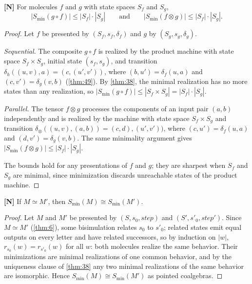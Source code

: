 \begin{theorem}\label{thm:40}
\textbf{[N]} For molecules $f$ and $g$ with state spaces $S_f$ and $S_g$,
\[
|S_{\min} (g \circ f)| \leq |S_f| \cdot |S_g|
\qquad\text{and}\qquad
|S_{\min} (f \otimes g)| \leq |S_f| \cdot |S_g| .
\]
\end{theorem}

\begin{proof}
Let $f$ be presented by $(S_f, s_f, \delta_f)$ and $g$ by $(S_g, s_g, \delta_g)$.

\emph{Sequential.} The composite $g \circ f$ is realized by the product machine with
state space $S_f \times S_g$, initial state $(s_f, s_g)$, and transition
$\delta_h ((u,v), a) = (c, (u',v'))$, where $(b, u') = \delta_f (u, a)$ and
$(c, v') = \delta_g (v, b)$ (\autoref{thm:49}). By \autoref{thm:38}, the minimal
realization has no more states than any realization, so $|S_{\min} (g \circ f)| \leq
|S_f \times S_g| = |S_f| \cdot |S_g|$.

\emph{Parallel.} The tensor $f \otimes g$ processes the components of an input pair
$(a, b)$ independently and is realized by the machine with state space $S_f \times S_g$
and transition $\delta_\otimes ((u,v),(a,b)) = (c,d),(u',v'))$, where
$(c, u') = \delta_f (u,a)$ and $(d, v') = \delta_g (v,b)$. The same minimality argument
gives $|S_{\min} (f \otimes g)| \leq |S_f| \cdot |S_g|$.

The bounds hold for any presentations of $f$ and $g$; they are sharpest when $S_f$ and
$S_g$ are minimal, since minimization discards unreachable states of the product
machine.
\end{proof}

\begin{theorem}\label{thm:41}
\textbf{[N]} If $M \simeq M'$, then $S_{\min} (M) \cong S_{\min} (M')$.
\end{theorem}

\begin{proof}
Let $M$ and $M'$ be presented by $(S, s_0, \mathit{step})$ and
$(S', s'_0, \mathit{step}')$. Since $M \simeq M'$ (\autoref{thm:6}), some bisimulation
relates $s_0$ to $s'_0$; related states emit equal outputs on every letter and have
related successors, so by induction on $|w|$, $r_{s_0} (w) = r_{s'_0} (w)$ for all $w$:
both molecules realize the same behavior. Their minimizations are minimal realizations
of one common behavior, and by the uniqueness clause of \autoref{thm:38} any two minimal
realizations of the same behavior are isomorphic. Hence $S_{\min} (M) \cong S_{\min} (M')$
as pointed coalgebras.
\end{proof}

